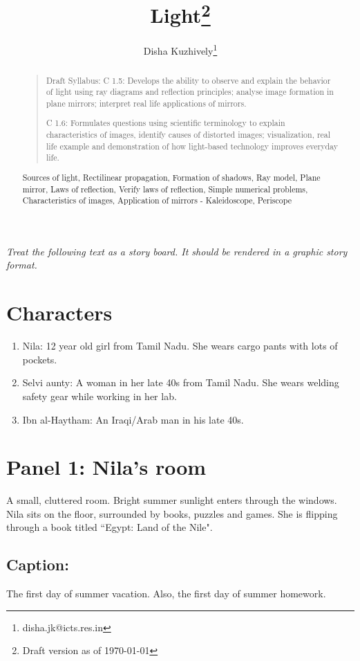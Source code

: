 \documentclass{xtufte-handout}
\title{Light\thanks{Draft version as of \today}}
\author{Disha Kuzhively\thanks{disha.jk@icts.res.in}}
\begin{document}
\maketitle
\begin{abstract}
    \begin{quotation}
Draft Syllabus:
C 1.5: Develops the ability to observe and explain the behavior of light using ray diagrams and reflection principles; analyse image formation in plane mirrors; interpret real life applications of mirrors.

C 1.6: Formulates questions using scientific terminology to explain characteristics of images, identify causes of distorted images; visualization, real life example and demonstration of how light-based technology improves everyday life.

\end{quotation}
Sources of light, Rectilinear propagation, Formation of shadows, Ray model, Plane mirror, Laws of reflection, Verify laws of reflection, Simple numerical problems, Characteristics of images, Application of mirrors - Kaleidoscope, Periscope
\end{abstract}
\newpage
\emph{Treat the following text as a story board. It should be rendered in a graphic story format.}
\section{Characters}
\begin{enumerate}
    \item Nila: 12 year old girl from Tamil Nadu. She wears cargo pants with lots of pockets.
    \item Selvi aunty: A woman in her late 40s from Tamil Nadu. She wears welding safety gear while working in her lab.
    \item Ibn al-Haytham: An Iraqi/Arab man in his late 40s.
\end{enumerate}
\section{Panel 1: Nila's room}
A small, cluttered room. Bright summer sunlight enters through the windows. Nila sits on the floor, surrounded by books, puzzles and games. She is flipping through a book titled ``Egypt: Land of the Nile".
\subsection{Caption:} The first day of summer vacation. Also, the first day of summer homework.
\end{document}
